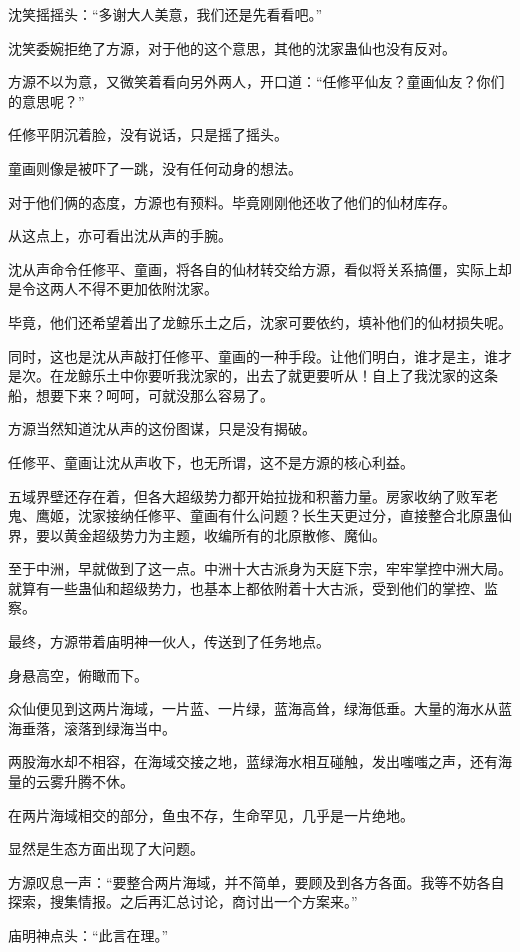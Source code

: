 \begin{this_body}
沈笑摇摇头：“多谢大人美意，我们还是先看看吧。”

沈笑委婉拒绝了方源，对于他的这个意思，其他的沈家蛊仙也没有反对。

方源不以为意，又微笑着看向另外两人，开口道：“任修平仙友？童画仙友？你们的意思呢？”

任修平阴沉着脸，没有说话，只是摇了摇头。

童画则像是被吓了一跳，没有任何动身的想法。

对于他们俩的态度，方源也有预料。毕竟刚刚他还收了他们的仙材库存。

从这点上，亦可看出沈从声的手腕。

沈从声命令任修平、童画，将各自的仙材转交给方源，看似将关系搞僵，实际上却是令这两人不得不更加依附沈家。

毕竟，他们还希望着出了龙鲸乐土之后，沈家可要依约，填补他们的仙材损失呢。

同时，这也是沈从声敲打任修平、童画的一种手段。让他们明白，谁才是主，谁才是次。在龙鲸乐土中你要听我沈家的，出去了就更要听从！自上了我沈家的这条船，想要下来？呵呵，可就没那么容易了。

方源当然知道沈从声的这份图谋，只是没有揭破。

任修平、童画让沈从声收下，也无所谓，这不是方源的核心利益。

五域界壁还存在着，但各大超级势力都开始拉拢和积蓄力量。房家收纳了败军老鬼、鹰姬，沈家接纳任修平、童画有什么问题？长生天更过分，直接整合北原蛊仙界，要以黄金超级势力为主题，收编所有的北原散修、魔仙。

至于中洲，早就做到了这一点。中洲十大古派身为天庭下宗，牢牢掌控中洲大局。就算有一些蛊仙和超级势力，也基本上都依附着十大古派，受到他们的掌控、监察。

最终，方源带着庙明神一伙人，传送到了任务地点。

身悬高空，俯瞰而下。

众仙便见到这两片海域，一片蓝、一片绿，蓝海高耸，绿海低垂。大量的海水从蓝海垂落，滚落到绿海当中。

两股海水却不相容，在海域交接之地，蓝绿海水相互碰触，发出嗤嗤之声，还有海量的云雾升腾不休。

在两片海域相交的部分，鱼虫不存，生命罕见，几乎是一片绝地。

显然是生态方面出现了大问题。

方源叹息一声：“要整合两片海域，并不简单，要顾及到各方各面。我等不妨各自探索，搜集情报。之后再汇总讨论，商讨出一个方案来。”

庙明神点头：“此言在理。”


\end{this_body}
